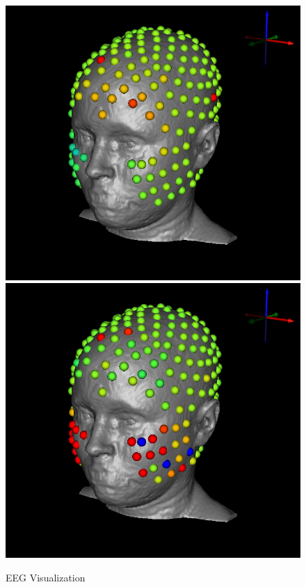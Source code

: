 \begin{figure}[H]
\begin{center}
\includegraphics[width=.49\textwidth]{Figures/eeg_1}
\includegraphics[width=.49\textwidth]{Figures/eeg_2}
\caption{EEG Visualization}
\label{fig:eegvis}
\end{center}
\end{figure}